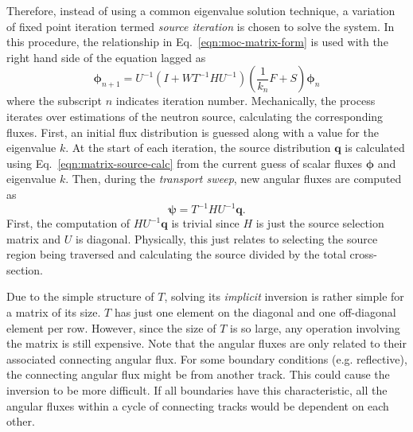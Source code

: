 Therefore, instead of using a common eigenvalue solution technique, a variation of fixed point iteration termed \textit{source iteration} is chosen to solve the system. In this procedure, the relationship in Eq.~\ref{eqn:moc-matrix-form} is used with the right hand side of the equation lagged as
\begin{equation}
\boldsymbol{\phi}_{n+1} = U^{-1}\left( I + W T^{-1} H U^{-1}\right) \left(\frac{1}{k_n} F + S \right) \boldsymbol{\phi}_n
\end{equation}
where the subscript $n$ indicates iteration number. Mechanically, the process iterates over estimations of the neutron source, calculating the corresponding fluxes. First, an initial flux distribution is guessed along with a value for the eigenvalue $k$. At the start of each iteration, the source distribution $\mathbf{q}$ is calculated using Eq.~\ref{eqn:matrix-source-calc} from the current guess of scalar fluxes $\boldsymbol{\phi}$ and eigenvalue $k$. Then, during the \textit{transport sweep}, new angular fluxes are computed as
\begin{equation}
\boldsymbol{\psi} = T^{-1} H U^{-1} \mathbf{q}.
\end{equation}
First, the computation of $HU^{-1}\mathbf{q}$ is trivial since $H$ is just the source selection matrix and $U$ is diagonal. Physically, this just relates to selecting the source region being traversed and calculating the source divided by the total cross-section.

Due to the simple structure of $T$, solving its \textit{implicit} inversion is rather simple for a matrix of its size. $T$ has just one element on the diagonal and one off-diagonal element per row. However, since the size of $T$ is so large, any operation involving the matrix is still expensive. Note that the angular fluxes are only related to their associated connecting angular flux. For some boundary conditions (e.g. reflective), the connecting angular flux might be from another track. This could cause the inversion to be more difficult. If all boundaries have this characteristic, all the angular fluxes within a cycle of connecting tracks would be dependent on each other.

